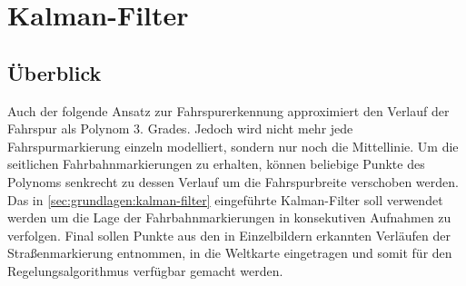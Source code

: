 \section{Kalman-Filter \dcsecondauthorshort}
\label{sec:fahrspurerkennung_kalman}

\subsection{Überblick} \label{ssec:fahrspurerkennung:kalman-filter:ueberblick}
Auch der folgende Ansatz zur Fahrspurerkennung approximiert den Verlauf der Fahrspur als Polynom 3. Grades. Jedoch wird nicht mehr jede Fahrspurmarkierung einzeln modelliert, sondern nur noch die Mittellinie. Um die seitlichen Fahrbahnmarkierungen zu erhalten, können beliebige Punkte des Polynoms senkrecht zu dessen Verlauf um die Fahrspurbreite verschoben werden.
Das in \ref{sec:grundlagen:kalman-filter} eingeführte Kalman-Filter soll verwendet werden um die Lage der Fahrbahnmarkierungen in konsekutiven Aufnahmen zu verfolgen. Final sollen Punkte aus den in Einzelbildern erkannten Verläufen der Straßenmarkierung entnommen, in die Weltkarte eingetragen und somit für den Regelungsalgorithmus verfügbar gemacht werden.

